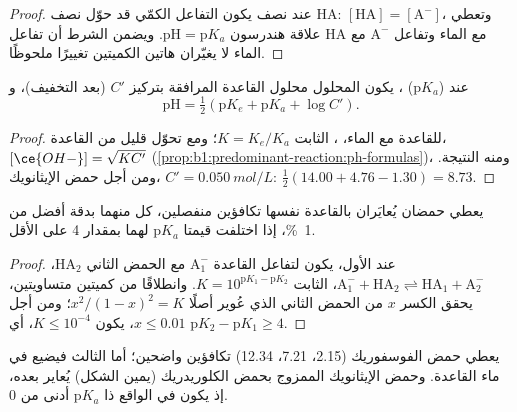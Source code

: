 \begin{proof}
عند نصف  يكون التفاعل الكمّي 
قد حوّل نصف HA: $[\mathrm{HA}] = [\mathrm{A^-}]$،
وتعطي علاقة هندرسون $\mathrm{pH} = \mathrm{p}K_a$. ويضمن الشرط
أن تفاعل HA مع الماء وتفاعل $\mathrm{A^-}$
مع الماء لا يغيّران هاتين الكميتين تغييرًا ملحوظًا.
\end{proof}

\begin{proposition}\label{prop:b1:titration-methods:ph-at-equivalence}
عند   ($\mathrm{p}K_a$) ، يكون
المحلول محلول القاعدة المرافقة بتركيز $C'$ (بعد التخفيف)، و
\[
  \mathrm{pH} = \tfrac12(\mathrm{p}K_e + \mathrm{p}K_a + \log C') .
\]
\end{proposition}

\begin{proof}
 للقاعدة مع الماء،
، الثابت $K = K_e/K_a$؛ ومع تحوّل قليل
من القاعدة، $[\ce{OH-}] = \sqrt{KC'}$ (\cref{prop:b1:predominant-reaction:ph-formulas})،
ومنه النتيجة. ومن أجل حمض الإيثانويك، $C' = \qty{0.050}{mol/L}$:
$\frac12(14.00 + 4.76 - 1.30) = 8.73$.
\end{proof}

\begin{proposition}\label{prop:b1:titration-methods:successive}
يعطي حمضان يُعايَران بالقاعدة نفسها تكافؤين منفصلين، كل منهما بدقة
أفضل من \qty{1}{\percent}، إذا اختلفت قيمتا $\mathrm{p}K_a$ لهما بمقدار 4 على الأقل.
\end{proposition}

\begin{proof}
عند  الأول، يكون لتفاعل القاعدة $\mathrm{A_1^-}$ مع
الحمض الثاني $\mathrm{HA_2}$، $\mathrm{A_1^-} + \mathrm{HA_2}
\rightleftharpoons \mathrm{HA_1} + \mathrm{A_2^-}$، الثابت $K = 10^{\mathrm{p}K_1 - \mathrm{p}K_2}$.
وانطلاقًا من كميتين متساويتين، يحقق الكسر $x$ من الحمض الثاني الذي
عُوير أصلًا $x^2/(1 - x)^2 = K$؛ ومن أجل $x \leqslant 0.01$، يكون $K
\leqslant 10^{-4}$، أي $\mathrm{p}K_2 - \mathrm{p}K_1 \geqslant 4$.
\end{proof}

يعطي حمض الفوسفوريك (2.15، 7.21، 12.34) تكافؤين واضحين؛ أما
الثالث فيضيع في ماء القاعدة. وحمض الإيثانويك الممزوج
بحمض الكلوريدريك (يمين الشكل) يُعاير بعده، إذ يكون  في الواقع ذا $\mathrm{p}K_a$ أدنى من 0.

